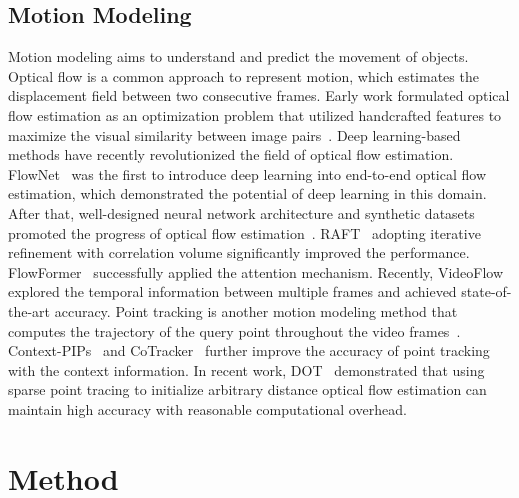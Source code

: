 \documentclass[10pt,twocolumn,letterpaper]{article}
\begin{document}
\subsection{Motion Modeling}
Motion modeling aims to understand and predict the movement of objects.
%
Optical flow is a common approach to represent motion, which estimates the displacement field between two consecutive frames. Early work formulated optical flow estimation as an optimization problem that utilized handcrafted features to maximize the visual similarity between image pairs~\cite{horn1981determining, black1993framework, bruhn2005lucas, sun2014quantitative}.
%
Deep learning-based methods have recently revolutionized the field of optical flow estimation. FlowNet~\cite{dosovitskiy2015flownet} was the first to introduce deep learning into end-to-end optical flow estimation, which demonstrated the potential of deep learning in this domain. After that, well-designed neural network architecture and synthetic datasets promoted the progress of optical flow estimation~\cite{ilg2017flownet, ranjan2017optical, sun2018pwc, sun2021loftr, hui2018liteflownet, hui2020lightweight, yang2019volumetric}. RAFT~\cite{teed2020raft} adopting iterative refinement with correlation volume significantly improved the performance. FlowFormer~\cite{huang2022flowformer,shi2023flowformer++} successfully applied the attention mechanism. Recently, VideoFlow~\cite{shi2023videoflow} explored the temporal information between multiple frames and achieved state-of-the-art accuracy.
%
Point tracking is another motion modeling method that computes the trajectory of the query point throughout the video frames~\cite{harley2022particle, doersch2022tap, zheng2023pointodyssey}. Context-PIPs~\cite{weikang2023context} and CoTracker~\cite{karaev2023cotracker} further improve the accuracy of point tracking with the context information. In recent work, DOT~\cite{moing2023dense} demonstrated that using sparse point tracing to initialize arbitrary distance optical flow estimation can maintain high accuracy with reasonable computational overhead.

\section{Method}
\end{document}

